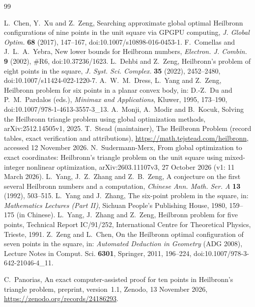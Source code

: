 \documentclass[11pt]{amsart}
\theoremstyle{definition}
\begin{document}
\begin{thebibliography}{99}

 L.~Chen, Y.~Xu and Z.~Zeng, Searching approximate global optimal Heilbronn configurations of nine points in the unit square via GPGPU computing, \emph{J. Global Optim.} \textbf{68} (2017), 147--167, doi:10.1007/s10898-016-0453-1.
 F.~Comellas and J.~L.~A.~Yebra, New lower bounds for Heilbronn numbers, \emph{Electron. J. Combin.} \textbf{9} (2002), \#R6, doi:10.37236/1623.
 L.~Dehbi and Z.~Zeng, Heilbronn's problem of eight points in the square, \emph{J. Syst. Sci. Complex.} \textbf{35} (2022), 2452--2480, doi:10.1007/s11424-022-1220-7.
 A.~W.~M.~Dress, L.~Yang and Z.~Zeng, Heilbronn problem for six points in a planar convex body, in: D.-Z.~Du and P.~M.~Pardalos (eds.), \emph{Minimax and Applications}, Kluwer, 1995, 173--190, doi:10.1007/978-1-4613-3557-3\_13.
 A.~Monji, A.~Modir and B.~Kocuk, Solving the Heilbronn triangle problem using global optimization methods, arXiv:2512.14505v1, 2025.
 T.~Stead (maintainer), The Heilbronn Problem (record tables, exact verification and attributions), \url{https://math.tejstead.com/heilbronn}, accessed 12 November 2026.
 N.~Sudermann-Merx, From global optimization to exact coordinates: Heilbronn's triangle problem on the unit square using mixed-integer nonlinear optimization, arXiv:2603.11107v3, 27 October 2026 (v1: 11 March 2026).
 L.~Yang, J.~Z.~Zhang and Z.~B.~Zeng, A conjecture on the first several Heilbronn numbers and a computation, \emph{Chinese Ann. Math. Ser. A} \textbf{13} (1992), 503--515.
 L.~Yang and J.~Zhang, The six-point problem in the square, in: \emph{Mathematics Lectures (Part II)}, Sichuan People's Publishing House, 1980, 159--175 (in Chinese).
 L.~Yang, J.~Zhang and Z.~Zeng, Heilbronn problem for five points, Technical Report IC/91/252, International Centre for Theoretical Physics, Trieste, 1991.
 Z.~Zeng and L.~Chen, On the Heilbronn optimal configuration of seven points in the square, in: \emph{Automated Deduction in Geometry} (ADG 2008), Lecture Notes in Comput. Sci. \textbf{6301}, Springer, 2011, 196--224, doi:10.1007/978-3-642-21046-4\_11.

 C.~Panorias, An exact computer-assisted proof for ten points in Heilbronn's triangle problem, preprint, version~1.1, Zenodo, 13 November 2026, \url{https://zenodo.org/records/24186293}.
\end{thebibliography}
\end{document}
